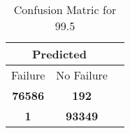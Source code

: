 \begin{table}[] 
\caption{Confusion Matric for 99.5} 
\label{Table: Prediction Accuracy-DMD99.5OnlySunEKF-ignoreReflectionEKF-top2perfectNoFailurePrediction-Reflection} 
\centering 
\begin{tabular} 
 {@{}ccc@{}} 
\toprule 
\multicolumn{2}{c}{\textbf{Predicted}}
 \\ \midrule 
\multicolumn{1}{|c|}{Failure} & 
\multicolumn{1}{c|}{No Failure}
 \\ \midrule 
\multicolumn{1}{|c|}{\color{green}\textbf{76586}} & 
\multicolumn{1}{c|}{\color{red}\textbf{192}}
 \\ \midrule 
\multicolumn{1}{|c|}{\color{red}\textbf{1}} & 
\multicolumn{1}{c|}{\color{green}\textbf{93349}}
 \\ \bottomrule 
\end{tabular} 
\end{table} 

